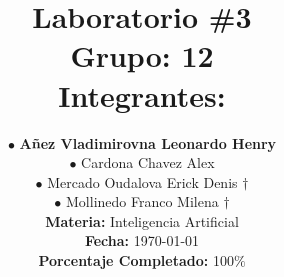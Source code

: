 
\newcommand{\NumeroLaboratorio}{3}		%
\newcommand{\PorcentajeCompletado}{100}	%





\title{
\hspace{-0.1cm}\LARGE{Laboratorio \#\NumeroLaboratorio} \\\vspace{0.05cm}
{\large Grupo: 12} \\\vspace{0.2cm}
{\large Integrantes:} \\\vspace{0.2cm}
}

\author{
\hspace{0.5cm}$\bullet$ \textbf{Añez Vladimirovna Leonardo Henry}\\
\hspace{0.5cm}$\bullet$ Cardona Chavez Alex\\
\hspace{0.5cm}$\bullet$ Mercado Oudalova Erick Denis $\dagger$\\
\hspace{0.5cm}$\bullet$ Mollinedo Franco Milena $\dagger$ \\\vspace{0.2cm}
\textbf{Materia:} Inteligencia Artificial \\\vspace{0.2cm}
\textbf{Fecha:} \today \\\vspace{0.2cm}
\textbf{Porcentaje Completado:} \PorcentajeCompletado$\%$
}
\maketitle